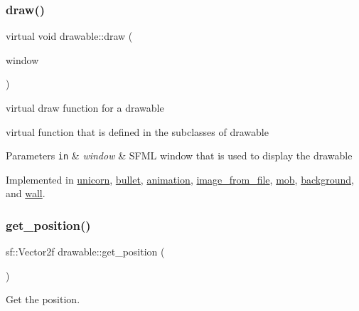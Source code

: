 \subsubsection{\texorpdfstring{draw()}{draw()}}
{\footnotesize\ttfamily virtual void drawable\+::draw (\begin{DoxyParamCaption}\item[{sf\+::\+Render\+Window \&}]{window }\end{DoxyParamCaption})\hspace{0.3cm}{\ttfamily [pure virtual]}}



virtual draw function for a drawable 

virtual function that is defined in the subclasses of drawable


\begin{DoxyParams}[1]{Parameters}
\mbox{\tt in}  & {\em window} & S\+F\+ML window that is used to display the drawable \\
\hline
\end{DoxyParams}


Implemented in \hyperlink{classunicorn_a570c34d5669a8d2a61bdc1481e6f9dee}{unicorn}, \hyperlink{classbullet_ae999b952538687d45ca2ae54164a5cd8}{bullet}, \hyperlink{classanimation_a20959b66d1c25007890bb40f0e876570}{animation}, \hyperlink{classimage__from__file_a26eae6c872ca9033cacc3f6eb2762983}{image\+\_\+from\+\_\+file}, \hyperlink{classmob_a52f5e29b2ac2d87c8c1be7e0ff5ec96b}{mob}, \hyperlink{classbackground_a41736f9a00defad1e84b3a8099c887e2}{background}, and \hyperlink{classwall_aa25b8377e1d9a209fabd2271294f05d0}{wall}.

\mbox{\label{classdrawable_a6a31ea381be2964d0115b782a66d3414}} 
\subsubsection{\texorpdfstring{get\+\_\+position()}{get\_position()}}
{\footnotesize\ttfamily sf\+::\+Vector2f drawable\+::get\+\_\+position (\begin{DoxyParamCaption}{ }\end{DoxyParamCaption})\hspace{0.3cm}{\ttfamily [virtual]}}



Get the position. 

